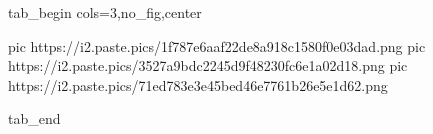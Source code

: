  
 
 
 
 


\ifcmt
  tab_begin cols=3,no_fig,center

     pic https://i2.paste.pics/1f787e6aaf22de8a918c1580f0e03dad.png
     pic https://i2.paste.pics/3527a9bdc2245d9f48230fc6e1a02d18.png
     pic https://i2.paste.pics/71ed783e3e45bed46e7761b26e5e1d62.png

  tab_end
\fi
